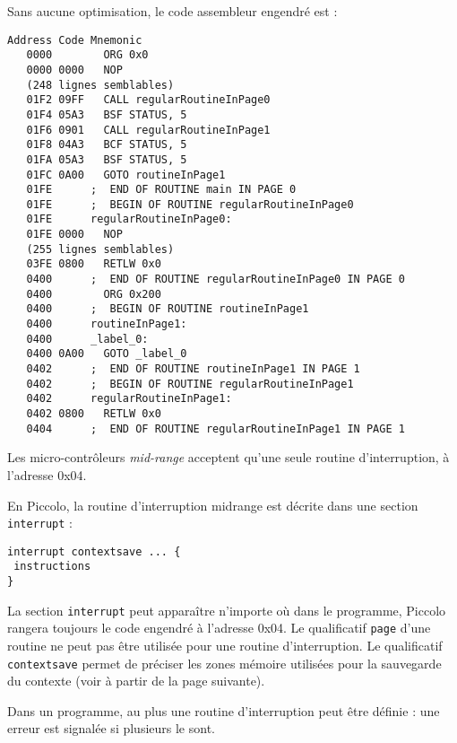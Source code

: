 Sans aucune optimisation, le code assembleur engendré est :

\begin{lstlisting}[language=assembleur]
Address Code Mnemonic
   0000        ORG 0x0
   0000 0000   NOP
   (248 lignes semblables)
   01F2 09FF   CALL regularRoutineInPage0
   01F4 05A3   BSF STATUS, 5
   01F6 0901   CALL regularRoutineInPage1
   01F8 04A3   BCF STATUS, 5
   01FA 05A3   BSF STATUS, 5
   01FC 0A00   GOTO routineInPage1
   01FE      ;  END OF ROUTINE main IN PAGE 0
   01FE      ;  BEGIN OF ROUTINE regularRoutineInPage0
   01FE      regularRoutineInPage0:
   01FE 0000   NOP
   (255 lignes semblables)
   03FE 0800   RETLW 0x0
   0400      ;  END OF ROUTINE regularRoutineInPage0 IN PAGE 0
   0400        ORG 0x200
   0400      ;  BEGIN OF ROUTINE routineInPage1
   0400      routineInPage1:
   0400      _label_0:
   0400 0A00   GOTO _label_0
   0402      ;  END OF ROUTINE routineInPage1 IN PAGE 1
   0402      ;  BEGIN OF ROUTINE regularRoutineInPage1
   0402      regularRoutineInPage1:
   0402 0800   RETLW 0x0
   0404      ;  END OF ROUTINE regularRoutineInPage1 IN PAGE 1
\end{lstlisting}














Les micro-contrôleurs \emph{mid-range} acceptent qu’une seule routine d’interruption, à l’adresse 0x04.

En Piccolo, la routine d’interruption midrange est décrite dans une section \texttt{interrupt} :

\begin{lstlisting}[language=piccolo]
interrupt contextsave ... {
 instructions
}
\end{lstlisting}

La section \texttt{interrupt} peut apparaître n’importe où dans le programme, Piccolo rangera toujours le code engendré à l’adresse 0x04. Le qualificatif \texttt{page} d’une routine ne peut pas être utilisée pour une routine d’interruption. Le qualificatif \texttt{contextsave} permet de préciser les zones mémoire utilisées pour la sauvegarde du contexte (voir à partir de la page suivante).

Dans un programme, au plus une routine d’interruption peut être définie : une erreur est signalée si plusieurs le sont.

